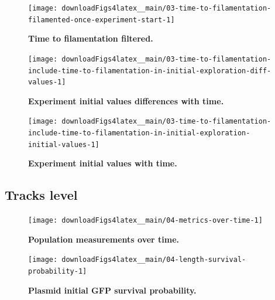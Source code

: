 \documentclass[a4paper, nobind]{templates/ociamthesis}
\begin{document}
\begin{figure}[H]
\texttt{[image: downloadFigs4latex\_\_main/03-time-to-filamentation-filamented-once-experiment-start-1]} \caption[Time to filamentation filtered.]{\textbf{Time to filamentation filtered.}}\label{fig:03-time-to-filamentation-filamented-once-experiment-start-1}
\end{figure}





\begin{figure}[H]
\texttt{[image: downloadFigs4latex\_\_main/03-time-to-filamentation-include-time-to-filamentation-in-initial-exploration-diff-values-1]} \caption[Experiment initial values differences with time.]{\textbf{Experiment initial values differences with time.}}\label{fig:03-time-to-filamentation-include-time-to-filamentation-in-initial-exploration-diff-values-1}
\end{figure}





\begin{figure}[H]
\texttt{[image: downloadFigs4latex\_\_main/03-time-to-filamentation-include-time-to-filamentation-in-initial-exploration-initial-values-1]} \caption[Experiment initial values with time.]{\textbf{Experiment initial values with time.}}\label{fig:03-time-to-filamentation-include-time-to-filamentation-in-initial-exploration-initial-values-1}
\end{figure}

\hypertarget{tracks-level}{%
\subsection{Tracks level}\label{tracks-level}}





\begin{figure}[H]
\texttt{[image: downloadFigs4latex\_\_main/04-metrics-over-time-1]} \caption[Population measurements over time.]{\textbf{Population measurements over time.}}\label{fig:04-metrics-over-time-1}
\end{figure}





\begin{figure}[H]
\texttt{[image: downloadFigs4latex\_\_main/04-length-survival-probability-1]} \caption[Plasmid initial GFP survival probability.]{\textbf{Plasmid initial GFP survival probability.}}\label{fig:04-length-survival-probability-1}
\end{figure}
\end{document}
